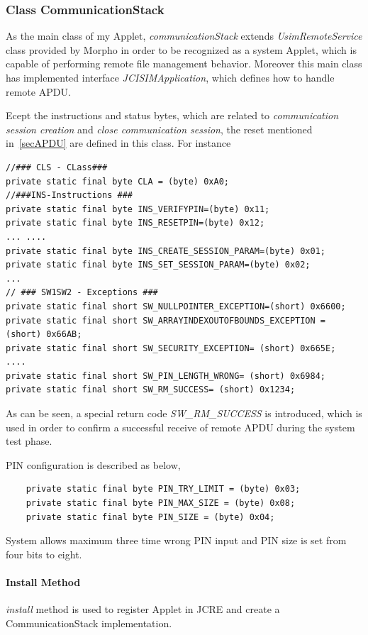 \subsubsection{Class CommunicationStack} \sloppy
As the main class of my Applet, \emph{communicationStack} extends \emph{UsimRemoteService} class provided by Morpho in order to be recognized as a system Applet, which is capable of performing remote file management behavior. Moreover this main class has implemented interface \emph{JCISIMApplication}, which defines how to handle remote APDU.

Ecept the instructions and status bytes, which are related to \emph{communication session creation} and \emph{close communication session},  the reset mentioned in~\ref{secAPDU} are defined in this class.
For instance
{\small
\begin{verbatim}
//### CLS - CLass###
private static final byte CLA = (byte) 0xA0;
//###INS-Instructions ###
private static final byte INS_VERIFYPIN=(byte) 0x11;
private static final byte INS_RESETPIN=(byte) 0x12;
... ....
private static final byte INS_CREATE_SESSION_PARAM=(byte) 0x01; 
private static final byte INS_SET_SESSION_PARAM=(byte) 0x02;
...
// ### SW1SW2 - Exceptions ###
private static final short SW_NULLPOINTER_EXCEPTION=(short) 0x6600;
private static final short SW_ARRAYINDEXOUTOFBOUNDS_EXCEPTION = (short) 0x66AB;
private static final short SW_SECURITY_EXCEPTION= (short) 0x665E;
....
private static final short SW_PIN_LENGTH_WRONG= (short) 0x6984;
private static final short SW_RM_SUCCESS= (short) 0x1234;
\end{verbatim}
}
As can be seen, a special return code \emph{SW\_RM\_SUCCESS} is introduced, which is used in order to confirm a successful receive of remote APDU during the system test phase. 

PIN configuration is described as below, 
{\small
\begin{verbatim}
    private static final byte PIN_TRY_LIMIT = (byte) 0x03;
    private static final byte PIN_MAX_SIZE = (byte) 0x08;
    private static final byte PIN_SIZE = (byte) 0x04;
\end{verbatim}
}
System allows maximum three time wrong PIN input and PIN size is set from four bits to eight.

\paragraph{Install Method}
\emph{install} method is used to register Applet in JCRE and create a CommunicationStack implementation.
